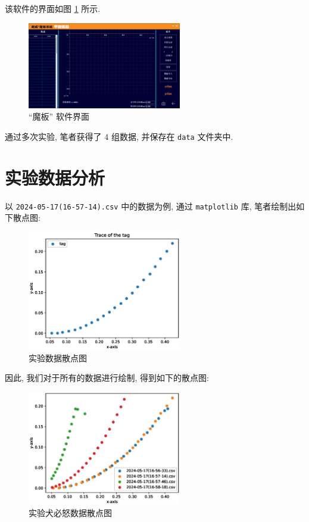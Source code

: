 \documentclass{article}
\begin{document}
该软件的界面如图 \ref{fig:software} 所示.

\begin{figure}[H]
    \centering
    \includegraphics[width=0.6\textwidth]{figures/magic-board.png}
    \caption{``魔板'' 软件界面}
    \label{fig:software}
\end{figure}

通过多次实验, 笔者获得了 $4$ 组数据, 并保存在 \texttt{data} 文件夹中.

\section{实验数据分析}

以 \texttt{2024-05-17(16-57-14).csv} 中的数据为例, 通过 \texttt{matplotlib} 库, 笔者绘制出如下散点图:

\begin{figure}[H]
    \centering
    \includegraphics[width=0.6\textwidth]{figures/plot1.eps}
    \caption{实验数据散点图}
    \label{fig:scatter-plot-1}
\end{figure}

因此, 我们对于所有的数据进行绘制, 得到如下的散点图:

\begin{figure}[H]
    \centering
    \includegraphics[width=0.6\textwidth]{figures/plot-all.eps}
    \caption{实验犬必怒数据散点图}
    \label{fig:scatter-plot-2}
\end{figure}
\end{document}
